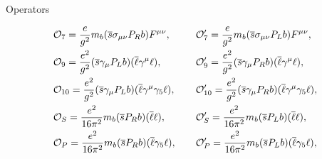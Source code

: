 \documentclass[aspectratio=1610]{beamer}
\begin{document}
\begin{frame}{Operators}

\begin{alignat*}{2}
&{\mathcal{O}}_{7} = \frac{e}{g^{2}}m_{{b}}({\overline {{s}}}\sigma_{\mu\nu}P_{R}{b})F^{\mu\nu},~~~~~&&{\mathcal{O}}_{7}^{\prime} = \frac{e}{g^{2}}m_{{b}}({\overline {{s}}}\sigma_{\mu\nu}P_{L}{b})F^{\mu\nu}, \nonumber \\
&{\mathcal{O}}_{9} = \frac{e^{2}}{g^{2}}({\overline {{s}}}\gamma_{\mu}P_{L}{b})({\overline \ell}\gamma^{\mu}\ell), &&{\mathcal{O}}_{9}^{\prime} = \frac{e^{2}}{g^{2}}({\overline {{s}}}\gamma_{\mu}P_{R}{b})({\overline \ell}\gamma^{\mu}\ell), \nonumber \\
&{\mathcal{O}}_{10} = \frac{e^{2}}{g^{2}}({\overline {{s}}}\gamma_{\mu}P_{L}{b})({\overline \ell}\gamma^{\mu}\gamma_{5}\ell), &&{\mathcal{O}}_{10}^{\prime} = \frac{e^{2}}{g^{2}}({\overline {{s}}}\gamma_{\mu}P_{R}{b})({\overline \ell}\gamma^{\mu}\gamma_{5}\ell), \\
&{\mathcal{O}}_{S} = \frac{e^{2}}{16\pi^{2}}m_{{b}}({\overline {{s}}} P_{R}{b})({\overline \ell}\ell), &&{\mathcal{O}}_{S}^{\prime} = \frac{e^{2}}{16\pi^{2}}m_{{b}}({\overline {{s}}} P_{L}{b})({\overline \ell}\ell), \nonumber\\
&{\mathcal{O}}_{P} = \frac{e^{2}}{16\pi^{2}}m_{{b}}({\overline {{s}}} P_{R}{b})({\overline \ell}\gamma_{5}\ell), &&{\mathcal{O}}_{P}^{\prime} = \frac{e^{2}}{16\pi^{2}}m_{{b}}({\overline {{s}}} P_{L}{b})({\overline \ell}\gamma_{5}\ell), \nonumber
\end{alignat*}

\end{frame}
\end{document}
